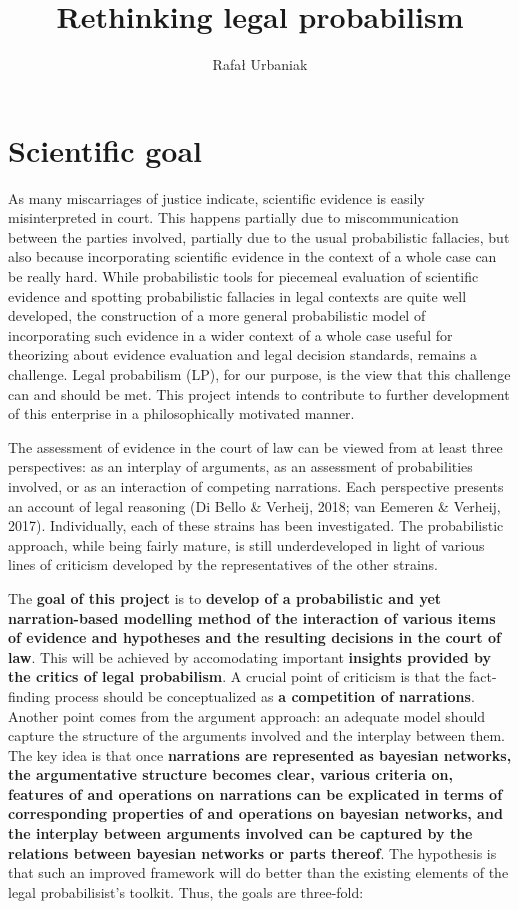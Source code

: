\documentclass[11pt,dvipsnames,enabledeprecatedfontcommands]{scrartcl}
\title{Rethinking legal probabilism}
\author{Rafał Urbaniak}
\date{}
\begin{document}
\maketitle

\thispagestyle{empty}

\hypertarget{scientific-goal}{%
\section{Scientific goal}\label{scientific-goal}}

As many miscarriages of justice indicate, scientific evidence is easily
misinterpreted in court. This happens partially due to miscommunication
between the parties involved, partially due to the usual probabilistic
fallacies, but also because incorporating scientific evidence in the
context of a whole case can be really hard. While probabilistic tools
for piecemeal evaluation of scientific evidence and spotting
probabilistic fallacies in legal contexts are quite well developed, the
construction of a more general probabilistic model of incorporating such
evidence in a wider context of a whole case useful for theorizing about
evidence evaluation and legal decision standards, remains a challenge.
Legal probabilism (LP), for our purpose, is the view that this challenge
can and should be met. This project intends to contribute to further
development of this enterprise in a philosophically motivated manner.

The assessment of evidence in the court of law can be viewed from at
least three perspectives: as an interplay of arguments, as an assessment
of probabilities involved, or as an interaction of competing narrations.
Each perspective presents an account of legal reasoning (Di Bello \&
Verheij, 2018; van Eemeren \& Verheij, 2017). Individually, each of
these strains has been investigated. The probabilistic approach, while
being fairly mature, is still underdeveloped in light of various lines
of criticism developed by the representatives of the other strains.

The \textbf{goal of this project} is to
\textbf{develop of a probabilistic and yet narration-based  modelling method of the  interaction of various items of evidence and hypotheses and the resulting decisions in the court of law}.
This will be achieved by accomodating important
\textbf{insights provided by the critics of legal probabilism}. A
crucial point of criticism is that the fact-finding process should be
conceptualized as \textbf{a competition of narrations}. Another point
comes from the argument approach: an adequate model should capture the
structure of the arguments involved and the interplay between them. The
key idea is that once
\textbf{narrations are represented as bayesian networks, the argumentative structure becomes clear,  various criteria on,  features of  and operations on narrations can be explicated in terms of corresponding properties of and operations on bayesian networks, and the interplay between arguments involved can be captured by the relations between bayesian networks or parts thereof}.
The hypothesis is that such an improved framework will do better than
the existing elements of the legal probabilisist's toolkit. Thus, the
goals are three-fold:
\end{document}
